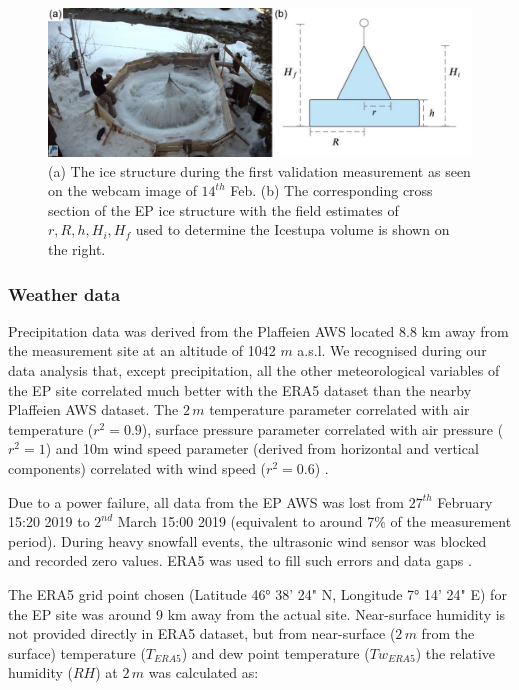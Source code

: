 \documentclass[utf8]{frontiersSCNS} %
\begin{document}
\begin{figure} 
    \centering 
    \includegraphics[width=15cm]{./Figures/Figure_2.jpg}
\caption{(a) The ice structure during the first validation measurement as seen on the webcam image of
  $14^{th}$ Feb. (b) The corresponding cross section of the EP ice structure with the field estimates of $r, R,
  h, H_i, H_f$ used to determine the Icestupa volume is shown on the right.} 
  \label{fig:CH19site} 
  \end{figure}

\subsubsection{Weather data}
Precipitation data was derived from the Plaffeien AWS \citep{meteoswiss} located 8.8 km away from the measurement site
at an altitude of 1042 $m$ a.s.l.  We recognised during our data analysis that, except precipitation, all the other
meteorological variables of the EP site correlated much better with the ERA5 dataset than the nearby Plaffeien AWS
dataset. The $2\,m$ temperature parameter correlated with air temperature ($r^2 =0.9 $), surface pressure parameter
correlated with air pressure ($r^2 = 1$) and 10m wind speed parameter (derived from horizontal and vertical components)
correlated with wind speed ($r^2 =0.6 $) .

Due to a power failure, all data from the EP AWS was lost from $27^{th}$ February 15:20 2019 to $2^{nd}$ March 15:00
2019 (equivalent to around 7\% of the measurement period). During heavy snowfall events, the ultrasonic wind sensor was
blocked and recorded zero values. ERA5 was used to fill such errors and data gaps .

The ERA5 grid point chosen (Latitude 46° 38' 24" N, Longitude 7° 14' 24" E) for the EP site was around 9 km away from
the actual site. Near-surface humidity is not provided directly in ERA5 dataset, but from near-surface ($2\,m$ from the
surface) temperature ($T_{ERA5}$) and dew point temperature ($Tw_{ERA5}$) the relative humidity ($RH$) at $2\,m$  was
calculated as: 
\end{document}
